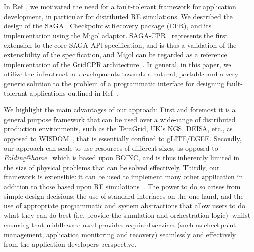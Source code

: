 \documentclass{rspublic}
\newcommand{\alnote}[1]{ {\textcolor{blue} { ***AL: #1 }}}
\newcommand{\amnote}[1]{ {\textcolor{magenta} { ***AM: #1 }}}
\newcommand{\jhanote}[1]{ {\textcolor{red} { ***SJ: #1 }}}
\newcommand{\alnote}[1]{}
\newcommand{\amnote}[1]{}
\newcommand{\jhanote}[1]{}
\begin{document}

In Ref~\cite{saga-migol-eScience08}, we motivated the need for a
fault-tolerant framework for application development, in particular
for distributed RE simulations.  We described the design of the
SAGA~\citep{saga_gfd90} Checkpoint\,\&\,Recovery package (CPR), and
its implementation using the Migol adaptor. SAGA-CPR~\citep{saga-cpr}
represents the first extension to the core SAGA API specification, and
is thus a validation of the extensibility of the specification, and
Migol can be regarded as a reference implementation of the GridCPR
architecture~\citep{ogf_cpr_arch}. In general, in this paper, we
utilize the infrastructual developments towards a natural, portable
and a very generic solution to the problem of a programmatic interface
for designing fault-tolerant applications outlined in
Ref~\cite{saga-migol-eScience08}.


We highlight the main advantages of our approach: First and foremost
it is a general purpose framework that can be used over a wide-range
of distributed production environments, such as the TeraGrid, UK's
NGS, DEISA, etc., as opposed to WISDOM~\citep{wisdom}, that is
essentially confined to gLITE/EGEE. Secondly, our approach can scale
to use resources of different sizes, as opposed to {\it
  Folding@home}~\citep{folding} which is based upon BOINC, and is thus
inherently limited in the size of physical problems that can be solved
effectively.  Thirdly, our framework is extensible: it can be used to
implement many other application in addition to those based upon RE
simulations~\citep{escience07}. The power to do so arises from simple
design decisions: the use of standard interfaces on the one hand, and
the use of appropriate programmatic and system abstractions that allow
users to do what they can do best (i.e. provide the simulation and
orchestration logic), whilst ensuring that middleware used provides
required services (such as checkpoint management, application
monitoring and recovery) seamlessly and effectively from the
application developers perspective.
\end{document}
